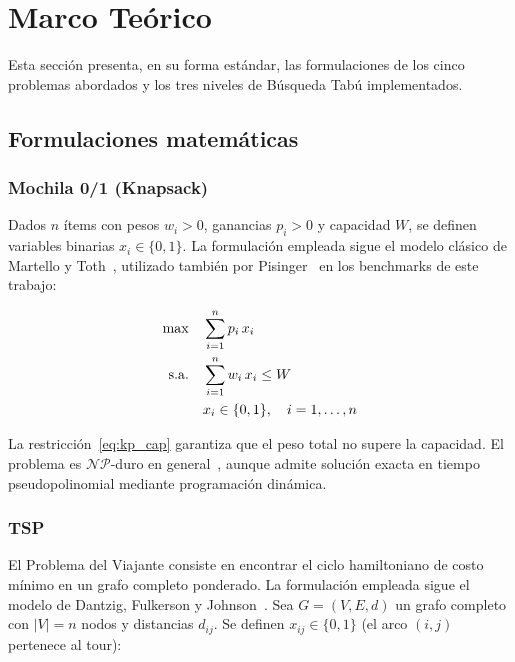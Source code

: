 \section{Marco Teórico}
\label{sec:marco}

Esta sección presenta, en su forma estándar, las formulaciones de los cinco
problemas abordados y los tres niveles de Búsqueda Tabú implementados.

\subsection{Formulaciones matemáticas}

\subsubsection{Mochila 0/1 (Knapsack)}
Dados $n$ ítems con pesos $w_i > 0$, ganancias $p_i > 0$ y capacidad
$W$, se definen variables binarias $x_i \in \{0,1\}$.
La formulación empleada sigue el modelo clásico de Martello y
Toth~\cite{martello1990knapsack}, utilizado también por
Pisinger~\cite{pisinger2005hard} en los benchmarks de este trabajo:

\begin{align}
  \max        \quad & \sum_{i=1}^{n} p_i\, x_i \label{eq:kp_obj}\\
  \text{s.a.} \quad & \sum_{i=1}^{n} w_i\, x_i \leq W \label{eq:kp_cap}\\
                    & x_i \in \{0,1\}, \quad i = 1,\ldots,n \notag
\end{align}

La restricción~\eqref{eq:kp_cap} garantiza que el peso total no supere
la capacidad.
El problema es $\mathcal{NP}$-duro en general~\cite{garey1979computers},
aunque admite solución exacta en tiempo pseudopolinomial mediante
programación dinámica.

\subsubsection{TSP}
El Problema del Viajante consiste en encontrar el ciclo hamiltoniano de
costo mínimo en un grafo completo ponderado.
La formulación empleada sigue el modelo de Dantzig, Fulkerson y
Johnson~\cite{dantzig1954solution}.
Sea $G=(V,E,d)$ un grafo completo con $|V|=n$ nodos y distancias
$d_{ij}$.
Se definen $x_{ij} \in \{0,1\}$ (el arco $(i,j)$ pertenece al tour):

